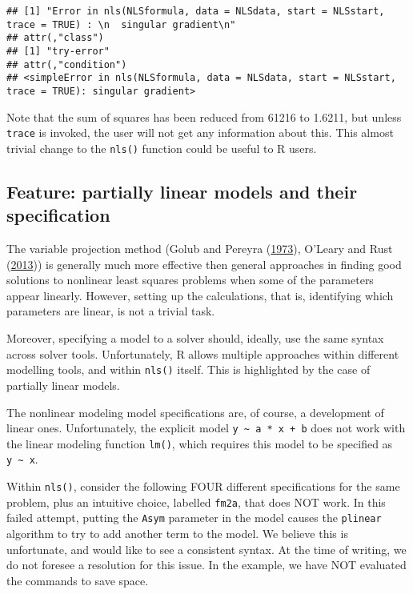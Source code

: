 \documentclass[
]{article}
\begin{document}
\begin{verbatim}
## [1] "Error in nls(NLSformula, data = NLSdata, start = NLSstart, trace = TRUE) : \n  singular gradient\n"
## attr(,"class")
## [1] "try-error"
## attr(,"condition")
## <simpleError in nls(NLSformula, data = NLSdata, start = NLSstart, trace = TRUE): singular gradient>
\end{verbatim}

Note that the sum of squares has been reduced from 61216 to 1.6211, but
unless \texttt{trace} is invoked, the user will not get any information
about this. This almost trivial change to the \texttt{nls()} function
could be useful to R users.

\hypertarget{feature-partially-linear-models-and-their-specification}{%
\subsection{Feature: partially linear models and their
specification}\label{feature-partially-linear-models-and-their-specification}}

The variable projection method (Golub and Pereyra
(\protect\hyperlink{ref-Golub1973}{1973}), O'Leary and Rust
(\protect\hyperlink{ref-OlearyRust13}{2013})) is generally much more
effective then general approaches in finding good solutions to nonlinear
least squares problems when some of the parameters appear linearly.
However, setting up the calculations, that is, identifying which
parameters are linear, is not a trivial task.

Moreover, specifying a model to a solver should, ideally, use the same
syntax across solver tools. Unfortunately, R allows multiple approaches
within different modelling tools, and within \texttt{nls()} itself. This
is highlighted by the case of partially linear models.

The nonlinear modeling model specifications are, of course, a
development of linear ones. Unfortunately, the explicit model
\texttt{y\ \textasciitilde{}\ a\ *\ x\ +\ b} does not work with the
linear modeling function \texttt{lm()}, which requires this model to be
specified as \texttt{y\ \textasciitilde{}\ x}.

Within \texttt{nls()}, consider the following FOUR different
specifications for the same problem, plus an intuitive choice, labelled
\texttt{fm2a}, that does NOT work. In this failed attempt, putting the
\texttt{Asym} parameter in the model causes the \texttt{plinear}
algorithm to try to add another term to the model. We believe this is
unfortunate, and would like to see a consistent syntax. At the time of
writing, we do not foresee a resolution for this issue. In the example,
we have NOT evaluated the commands to save space.
\end{document}
